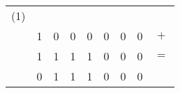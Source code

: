 \documentclass{standalone}
\begin{document}
\begin{tabular}{ ccccccccc }
	(1) & & & & & & & & \\
	& 1 & 0 & 0 & 0 & 0 & 0 & 0 & \(+\)\\
	& 1 & 1 & 1 & 1 & 0 & 0 & 0 & \(=\)\\\hline
	& 0 & 1 & 1 & 1 & 0 & 0 & 0 &
\end{tabular}
\end{document}
